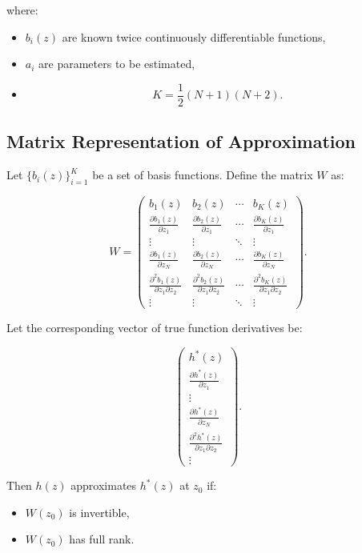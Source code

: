 where:
\begin{itemize}
    \item $b_i(z)$ are known twice continuously differentiable functions,
    \item $a_i$ are parameters to be estimated,
    \item
    \[
    K = \frac{1}{2}(N+1)(N+2).
    \]
\end{itemize}



\subsection*{Matrix Representation of Approximation}

Let $\{b_i(z)\}_{i=1}^K$ be a set of basis functions.
Define the matrix $W$ as:

\[
W =
\begin{pmatrix}
b_1(z) & b_2(z) & \cdots & b_K(z) \\
\frac{\partial b_1(z)}{\partial z_1} & \frac{\partial b_2(z)}{\partial z_1} & \cdots & \frac{\partial b_K(z)}{\partial z_1} \\
\vdots & \vdots & \ddots & \vdots \\
\frac{\partial b_1(z)}{\partial z_N} & \frac{\partial b_2(z)}{\partial z_N} & \cdots & \frac{\partial b_K(z)}{\partial z_N} \\
\frac{\partial^2 b_1(z)}{\partial z_1 \partial z_2} & \frac{\partial^2 b_2(z)}{\partial z_1 \partial z_2} & \cdots & \frac{\partial^2 b_K(z)}{\partial z_1 \partial z_2} \\
\vdots & \vdots & \ddots & \vdots
\end{pmatrix}.
\]

Let the corresponding vector of true function derivatives be:

\[
\begin{pmatrix}
h^*(z) \\
\frac{\partial h^*(z)}{\partial z_1} \\
\vdots \\
\frac{\partial h^*(z)}{\partial z_N} \\
\frac{\partial^2 h^*(z)}{\partial z_1 \partial z_2} \\
\vdots
\end{pmatrix}.
\]

Then $h(z)$ approximates $h^*(z)$ at $z_0$ if:

\begin{itemize}
\item $W(z_0)$ is invertible,
\item $W(z_0)$ has full rank.
\end{itemize}


